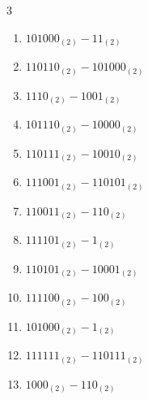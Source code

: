\begin{multicols}{3}
\begin{enumerate}

  \item $101000_{(2)} - 11_{(2)}$


  \item $110110_{(2)} - 101000_{(2)}$


  \item $1110_{(2)} - 1001_{(2)}$


  \item $101110_{(2)} - 10000_{(2)}$


  \item $110111_{(2)} - 10010_{(2)}$


  \item $111001_{(2)} - 110101_{(2)}$


\columnbreak %

  \item $110011_{(2)} - 110_{(2)}$


  \item $111101_{(2)} - 1_{(2)}$


  \item $110101_{(2)} - 10001_{(2)}$


  \item $111100_{(2)} - 100_{(2)}$


  \item $101000_{(2)} - 1_{(2)}$


  \item $111111_{(2)} - 110111_{(2)}$


  \item $1000_{(2)} - 110_{(2)}$



\end{enumerate}
\end{multicols}
